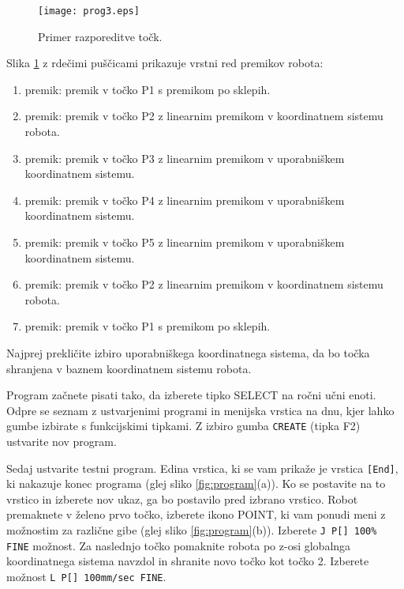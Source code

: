 \begin{figure}[!hbt]
	\centering
	\texttt{[image: prog3.eps]}
	\caption{Primer razporeditve točk.}
	\label{fig:prog2}
\end{figure}

Slika \ref{fig:prog2} z rdečimi puščicami prikazuje vrstni red premikov robota:

\begin{enumerate}
	\item premik: premik v točko P1 s premikom po sklepih.
	\item premik: premik v točko P2 z linearnim premikom v koordinatnem sistemu robota.
	\item premik: premik v točko P3 z linearnim premikom v uporabniškem koordinatnem sistemu.	
	\item premik: premik v točko P4 z linearnim premikom v uporabniškem koordinatnem sistemu.	
	\item premik: premik v točko P5 z linearnim premikom v uporabniškem koordinatnem sistemu.	
	\item premik: premik v točko P2 z linearnim premikom v koordinatnem sistemu robota.	
	\item premik: premik v točko P1 s premikom po sklepih.	
\end{enumerate}	

Najprej prekličite izbiro uporabniškega koordinatnega sistema, da bo točka shranjena v baznem koordinatnem sistemu robota.

Program začnete pisati tako, da izberete tipko SELECT na ročni učni enoti. Odpre se seznam z ustvarjenimi programi in menijska vrstica na dnu, kjer lahko gumbe izbirate s funkcijskimi tipkami. Z izbiro gumba \verb|CREATE| (tipka F2) ustvarite nov program. 

Sedaj ustvarite testni program. Edina vrstica, ki se vam prikaže je vrstica \verb|[End]|, ki nakazuje konec programa (glej sliko \ref{fig:program}(a)). Ko se postavite na to vrstico in izberete nov ukaz, ga bo postavilo pred izbrano vrstico. Robot premaknete v želeno prvo točko, izberete ikono POINT, ki vam ponudi meni z možnostim za različne gibe (glej sliko \ref{fig:program}(b)). Izberete \verb|J P[] 100% FINE| možnost. Za naslednjo točko pomaknite robota po z-osi globalnga koordinatnega sistema navzdol in shranite novo točko kot točko 2. Izberete možnost \verb|L P[] 100mm/sec FINE|.

